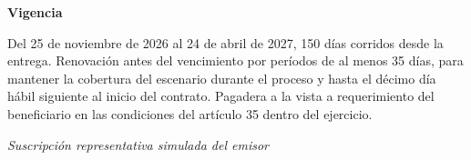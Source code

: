 \textbf{Vigencia}\par
Del 25 de noviembre de 2026 al 24 de abril de 2027, 150 días corridos desde la entrega. Renovación antes del vencimiento por períodos de al menos 35 días, para mantener la cobertura del escenario durante el proceso y hasta el décimo día hábil siguiente al inicio del contrato. Pagadera a la vista a requerimiento del beneficiario en las condiciones del artículo 35 dentro del ejercicio.

\medskip
\noindent\textit{Suscripción representativa simulada del emisor}\par
\label{adm:boleta-fin}
